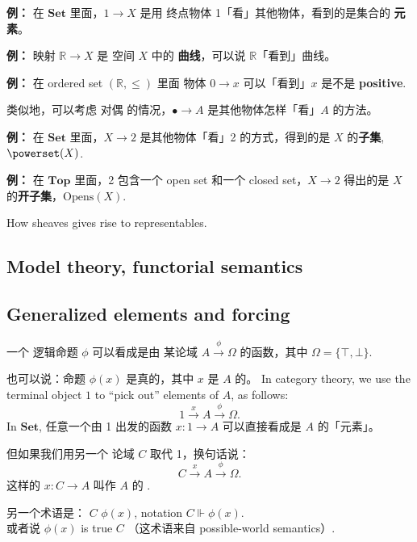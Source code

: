 \textbf{例：} 在 $\mathbf{Set}$ 里面，$1 \rightarrow X$ 是用 终点物体 1「看」其他物体，看到的是集合的 \textbf{元素}。

\textbf{例：} 映射 $\mathbb{R} \rightarrow X$ 是 空间 $X$ 中的 \textbf{曲线}，可以说 $\mathbb{R}$「看到」曲线。

\textbf{例：} 在 ordered set $(\mathbb{R}, \le)$ 里面 物体 $0 \rightarrow x$ 可以「看到」$x$ 是不是 \textbf{positive}.

类似地，可以考虑 对偶 的情况，$\bullet \rightarrow A$ 是其他物体怎样「看」$A$ 的方法。

\textbf{例：} 在 $\mathbf{Set}$ 里面，$X \rightarrow 2$ 是其他物体「看」2 的方式，得到的是 $X$ 的\textbf{子集}, $\powerset(X)$. 

\textbf{例：} 在 $\mathbf{Top}$ 里面，2 包含一个 open set 和一个 closed set，$X \rightarrow 2$ 得出的是 $X$ 的\textbf{开子集}，$\mathrm{Opens}(X)$.



How sheaves gives rise to representables.

\subsection{Model theory, functorial semantics}

\subsection{Generalized elements and forcing}

一个 逻辑命题 $\phi$ 可以看成是由 某论域 $A \stackrel{\phi}{\rightarrow} \Omega$ 的函数，其中 $\Omega = \{ \top, \bot \}$.

也可以说：命题 $\phi(x)$ 是真的，其中 $x$ 是 $A$ 的。 In category theory, we use the terminal object $1$ to ``pick out'' elements of $A$, as follows:
\begin{equation}
1 \stackrel{x}{\rightarrow} A \stackrel{\phi}{\rightarrow} \Omega.
\end{equation}
In $\mathbf{Set}$, 任意一个由 1 出发的函数 $x: 1 \rightarrow A$ 可以直接看成是 $A$ 的「元素」。

但如果我们用另一个 论域 $C$ 取代 1，换句话说：
\begin{equation}
C \stackrel{x}{\rightarrow} A \stackrel{\phi}{\rightarrow} \Omega.
\end{equation}
这样的 $x: C \rightarrow A$ 叫作 $A$ 的 .

另一个术语是： $C$  $\phi(x)$, notation $C \Vdash \phi(x)$. \\
或者说 $\phi(x)$ is true  $C$ （这术语来自 possible-world semantics）.

